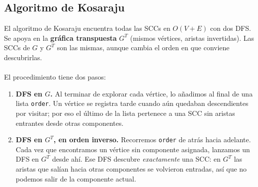 \subsection{Algoritmo de Kosaraju}
El algoritmo de Kosaraju encuentra todas las SCCs en $O(V + E)$ con dos DFS. Se apoya en la \textbf{gráfica transpuesta} $G^T$ (mismos vértices, aristas invertidas). Las SCCs de $G$ y $G^T$ son las mismas, aunque cambia el orden en que conviene descubrirlas.
\\\\
El procedimiento tiene dos pasos:
\begin{enumerate}
    \item \textbf{DFS en $G$.} Al terminar de explorar cada vértice, lo añadimos al final de una lista \texttt{order}. Un vértice se registra tarde cuando aún quedaban descendientes por visitar; por eso el último de la lista pertenece a una SCC sin aristas entrantes desde otras componentes.
    \item \textbf{DFS en $G^T$, en orden inverso.} Recorremos \texttt{order} de atrás hacia adelante. Cada vez que encontramos un vértice sin componente asignada, lanzamos un DFS en $G^T$ desde ahí. Ese DFS descubre \emph{exactamente} una SCC: en $G^T$ las aristas que salían hacia otras componentes se volvieron entradas, así que no podemos salir de la componente actual.
\end{enumerate}
 
\begin{figure}[H]
\centering
{}
\end{figure}
 
